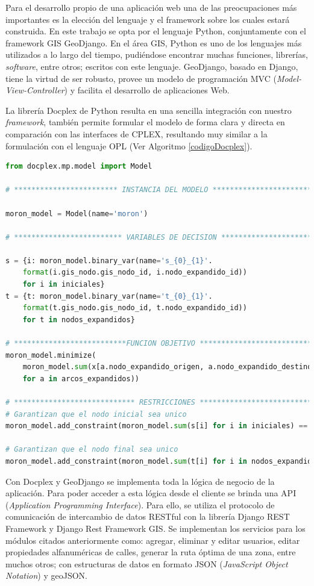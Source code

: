 Para el desarrollo propio de una aplicación web una de las preocupaciones más importantes es la elección del lenguaje y el framework sobre los cuales estará construida. En este trabajo se opta por el lenguaje Python, conjuntamente con el framework GIS GeoDjango. En el área GIS, Python es uno de los lenguajes más utilizados a lo largo del tiempo, pudiéndose encontrar muchas funciones, librerías, \textit{software}, entre otros; escritos con este lenguaje. GeoDjango, basado en Django, tiene la virtud de ser robusto, provee un modelo de programación MVC (\textit{Model-View-Controller}) y facilita el desarrollo de aplicaciones Web.

La librería Docplex de Python resulta en una sencilla integración con nuestro \textit{framework}, también permite formular el modelo de forma clara y directa en comparación con las interfaces de CPLEX, resultando muy similar a la formulación con el lenguaje OPL (Ver Algoritmo \ref{codigoDocplex}).


\begin{lstlisting}[language=Python,caption={Fragmento de código en docplex.},label={codigoDocplex}]
from docplex.mp.model import Model

# ************************ INSTANCIA DEL MODELO ******************************

moron_model = Model(name='moron')
    
# ************************* VARIABLES DE DECISION ****************************

s = {i: moron_model.binary_var(name='s_{0}_{1}'.
    format(i.gis_nodo.gis_nodo_id, i.nodo_expandido_id)) 
    for i in iniciales}
t = {t: moron_model.binary_var(name='t_{0}_{1}'.
    format(t.gis_nodo.gis_nodo_id, t.nodo_expandido_id)) 
    for t in nodos_expandidos}

# **************************FUNCION OBJETIVO *********************************
moron_model.minimize(
    moron_model.sum(x[a.nodo_expandido_origen, a.nodo_expandido_destino] * a.peso 
    for a in arcos_expandidos))
    
# **************************** RESTRICCIONES *********************************
# Garantizan que el nodo inicial sea unico
moron_model.add_constraint(moron_model.sum(s[i] for i in iniciales) == 1)

# Garantizan que el nodo final sea unico
moron_model.add_constraint(moron_model.sum(t[i] for i in nodos_expandidos) == 1))
\end{lstlisting}

Con Docplex y GeoDjango se implementa toda la lógica de negocio de la aplicación. Para poder acceder a esta lógica desde el cliente se brinda una API (\textit{Application Programming Interface}). Para ello, se utiliza el protocolo de comunicación de intercambio de datos RESTful con la librería Django REST Framework y Django Rest Framework GIS. Se implementan los servicios para los módulos citados anteriormente como: agregar, eliminar y editar usuarios, editar propiedades alfanuméricas de calles, generar la ruta óptima de una zona, entre muchos otros; con estructuras de datos en formato JSON (\textit{JavaScript Object Notation}) y geoJSON.

